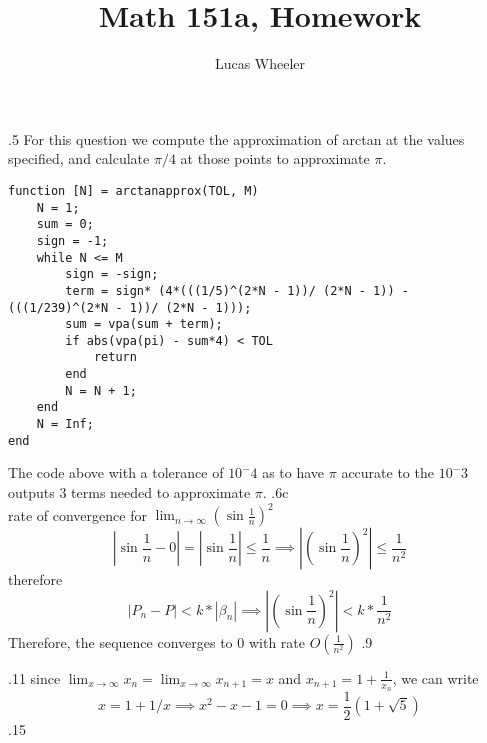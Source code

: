\documentclass[11pt]{exam}
\title{Math 151a, Homework \hw}
\author{Lucas Wheeler}
\date{}
\theoremstyle{plain}
\theoremstyle{definition}\newtheorem{definition}[theorem]{Definition}
\theoremstyle{definition}\newtheorem*{definition*}{Definition}
\begin{document}
\maketitle
\begin{questions}
.5
For this question we compute the approximation of arctan at the values specified, and calculate $\pi/4$ at those points to approximate $\pi$.
\begin{lstlisting}[style=Matlab-editor]
function [N] = arctanapprox(TOL, M)
    N = 1;
    sum = 0;
    sign = -1;
    while N <= M
        sign = -sign;
        term = sign* (4*(((1/5)^(2*N - 1))/ (2*N - 1)) - (((1/239)^(2*N - 1))/ (2*N - 1)));
        sum = vpa(sum + term);
        if abs(vpa(pi) - sum*4) < TOL
            return
        end
        N = N + 1;
    end
    N = Inf;
end

    \end{lstlisting}
The code above with a tolerance of $10^-4$ as to have $\pi$ accurate to the $10^-3$ outputs 3 terms needed to approximate $\pi$.  
.6c \\
rate of convergence for $\lim_{n \to \infty} \left( \sin{\frac{1}{n}} \right)^2$
\[\left| \sin{\frac{1}{n}} - 0 \right| = \left| \sin\frac{1}{n} \right| \leq \frac{1}{n} \implies \left| \left( \sin{\frac{1}{n}}\right)^2 \right| \leq \frac{1}{n^2}\]
therefore \[\left|P_n - P\right| < k * |\beta_n| \implies \left| \left( \sin{\frac{1}{n}}\right)^2 \right| < k *\frac{1}{n^2}\]
Therefore, the sequence converges to $0$ with rate $O(\frac{1}{n^2})$
.9
.11
since $\lim_{x \to \infty} x_n = \lim_{x \to \infty} x_{n+1} = x$ and $ x_{n + 1} = 1 + \frac{1}{x_n}$, we can write
\[x = 1 + 1/x \implies x^2 - x - 1 = 0 \implies x = \frac{1}{2} \left( 1  +\sqrt{5} \right)\]
.15
\begin{parts}

\end{parts}
\end{questions}
\end{document}
